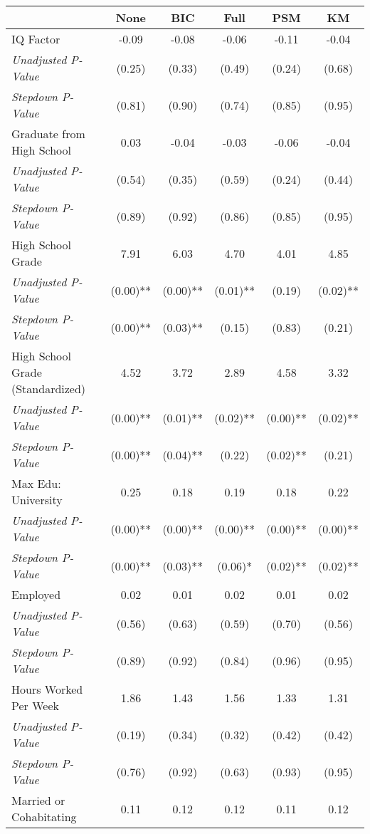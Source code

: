 \begin{tabular}{l c c c c c}
\toprule
 & None & BIC & Full & PSM & KM \\
\midrule
IQ Factor & -0.09 & -0.08 & -0.06 & -0.11 & -0.04 \\
\quad \textit{Unadjusted P-Value} & (0.25) & (0.33) & (0.49) & (0.24) & (0.68) \\
\quad \textit{Stepdown P-Value} & (0.81) & (0.90) & (0.74) & (0.85) & (0.95) \\
Graduate from High School & 0.03 & -0.04 & -0.03 & -0.06 & -0.04 \\
\quad \textit{Unadjusted P-Value} & (0.54) & (0.35) & (0.59) & (0.24) & (0.44) \\
\quad \textit{Stepdown P-Value} & (0.89) & (0.92) & (0.86) & (0.85) & (0.95) \\
High School Grade & 7.91 & 6.03 & 4.70 & 4.01 & 4.85 \\
\quad \textit{Unadjusted P-Value} & (0.00)** & (0.00)** & (0.01)** & (0.19) & (0.02)** \\
\quad \textit{Stepdown P-Value} & (0.00)** & (0.03)** & (0.15) & (0.83) & (0.21) \\
High School Grade (Standardized) & 4.52 & 3.72 & 2.89 & 4.58 & 3.32 \\
\quad \textit{Unadjusted P-Value} & (0.00)** & (0.01)** & (0.02)** & (0.00)** & (0.02)** \\
\quad \textit{Stepdown P-Value} & (0.00)** & (0.04)** & (0.22) & (0.02)** & (0.21) \\
Max Edu: University & 0.25 & 0.18 & 0.19 & 0.18 & 0.22 \\
\quad \textit{Unadjusted P-Value} & (0.00)** & (0.00)** & (0.00)** & (0.00)** & (0.00)** \\
\quad \textit{Stepdown P-Value} & (0.00)** & (0.03)** & (0.06)* & (0.02)** & (0.02)** \\
Employed & 0.02 & 0.01 & 0.02 & 0.01 & 0.02 \\
\quad \textit{Unadjusted P-Value} & (0.56) & (0.63) & (0.59) & (0.70) & (0.56) \\
\quad \textit{Stepdown P-Value} & (0.89) & (0.92) & (0.84) & (0.96) & (0.95) \\
Hours Worked Per Week & 1.86 & 1.43 & 1.56 & 1.33 & 1.31 \\
\quad \textit{Unadjusted P-Value} & (0.19) & (0.34) & (0.32) & (0.42) & (0.42) \\
\quad \textit{Stepdown P-Value} & (0.76) & (0.92) & (0.63) & (0.93) & (0.95) \\
Married or Cohabitating & 0.11 & 0.12 & 0.12 & 0.11 & 0.12 \\

\end{tabular}
